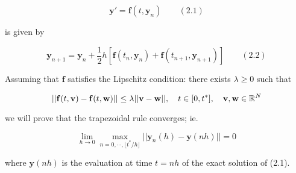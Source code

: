 \documentclass[a4paper]{article}
\begin{document}
\[ \mathbf{y}' = \mathbf{f}(t,\mathbf{y}_{n}) \qquad (2.1) \]

is given by

\[ \mathbf{y}_{n+1} = \mathbf{y}_{n} + \frac{1}{2} h [ \mathbf{f}(t_{n},\mathbf{y}_{n}) + \mathbf{f}(t_{n+1},\mathbf{y}_{n+1})  ] \qquad (2.2) \]

Assuming that $ \mathbf{f} $ satisfies the Lipschitz condition: there exists $ \lambda  \geq 0 $ such that

\[ | | \mathbf{f}(t,\mathbf{v}) - \mathbf{f}(t,\mathbf{w}) | | \leq \lambda | |  \mathbf{v} - \mathbf{w} | |, \quad t \in [0,t^{*}], \quad \mathbf{v},\mathbf{w} \in \mathbb{R}^{N} \]

we will prove that the trapezoidal rule converges; ie. 

\[ \lim\limits_{h \to 0} \max_{n = 0,\cdots,\lfloor t^{*} / h \rfloor } | |  \mathbf{y}_{n}(h) - \mathbf{y}(nh)  | | = 0 \]

where $ \mathbf{y}(nh) $ is the evaluation at time $ t = nh $ of the exact solution of (2.1).
\end{document}
